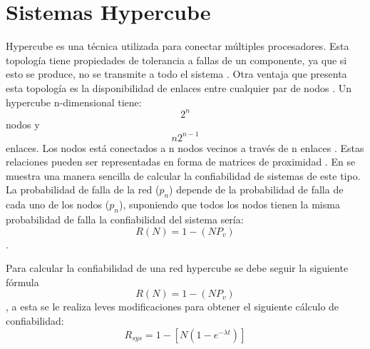 \section{Sistemas Hypercube}\label{sec:hypercube}
Hypercube es una técnica utilizada para
conectar múltiples procesadores. Esta topología
tiene propiedades de tolerancia a fallas de un
componente, ya que si esto se produce, no se
transmite a todo el sistema \citep{Rong96}. Otra ventaja que
presenta esta topología es la disponibilidad de
enlaces entre cualquier par de nodos \citep{Mostafa14}. Un
hypercube n-dimensional tiene: $$2^n $$ nodos y $$n2^{n-1}$$ enlaces.
Los nodos está conectados a n nodos vecinos a través de n enlaces \citep{Rong96}. Estas
relaciones pueden ser representadas en forma de matrices de proximidad \citep{Mostafa14}.
En \cite{Mostafa14} se muestra una manera sencilla de calcular la confiabilidad
de sistemas de este tipo. La probabilidad de falla de la red ($p_n$) depende
de la probabilidad de falla de cada uno de los nodos ($p_n$), suponiendo
que todos los nodos tienen la misma probabilidad de falla la confiabilidad
del sistema sería: $$R(N) = 1 -(NP_v)$$.

Para calcular la confiabilidad de una red hypercube se debe seguir
la siguiente fórmula $$R(N) = 1 -(NP_v)$$, a esta se le realiza leves modificaciones
para obtener el siguiente cálculo de confiabilidad: $$ R_{sys} = 1 - [N(1-e^{- \lambda t})]$$
